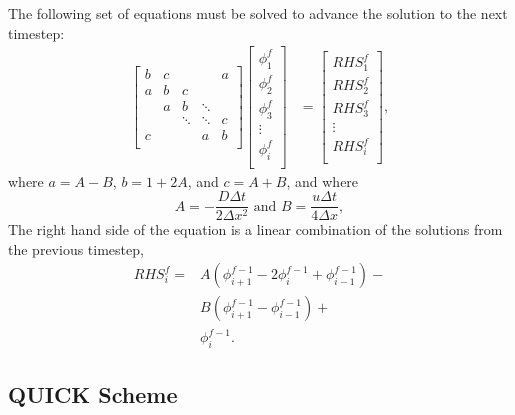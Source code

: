 \documentclass[twocolumn,10pt]{asme2ej}
\begin{document}
The following set of equations must be solved to advance the solution to the next timestep:
\begin{equation}
\begin{split}
\begin{bmatrix}
   { b } & { c } & {   }  & {   }  & { a } \\
   { a } & { b } & { c }  & {   }  & {   } \\
   {   } & { a } & { b }  & \ddots & {   } \\
   {   } & {   } & \ddots & \ddots & { c } \\
   { c } & {   } & {   }  & { a }  & { b } \\
\end{bmatrix}
\begin{bmatrix}
   {\phi_1^{f} }   \\
   {\phi_2^{f} }   \\
   {\phi_3^{f} }   \\
   \vdots   \\
   {\phi_{i}^{f} } \\
\end{bmatrix}
& =
\begin{bmatrix}
   {RHS_1^{f} }   \\
   {RHS_2^{f} }   \\
   {RHS_3^{f} }   \\
   \vdots   \\
   {RHS_{i}^{f} } \\
\end{bmatrix},
\end{split}
\end{equation}
where $a = A - B$, $b = 1 + 2 A $, and $c = A + B$, and where
\begin{equation}
A = -\frac{D \Delta t }{2 \Delta x^2} \mbox{ and } B = \frac{u \Delta t }{4 \Delta x},
\end{equation}
\noindent The right hand side of the equation is a linear combination of the solutions from the previous timestep,
\begin{equation}
\begin{split}
RHS_i^f = & A (\phi_{i+1}^{f-1} - 2 \phi_i^{f-1} + \phi_{i-1}^{f-1}) - \\
        & B (\phi_{i+1}^{f-1} - \phi_{i-1}^{f-1}) + \\
        & \phi_i^{f-1}.
\end{split}
\end{equation}

\subsection{QUICK Scheme}
\end{document}
